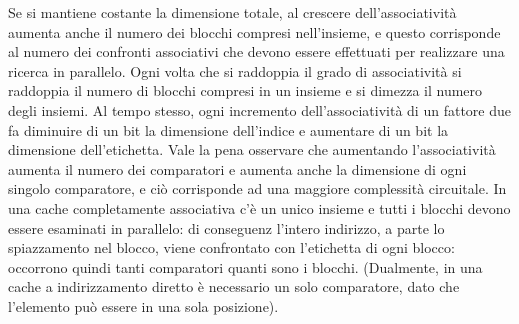 \begin{figure}[ht]
    \centering
    \setlength{\fboxrule}{0.5pt} %
    \setlength{\fboxsep}{0pt}    %
\end{figure}

Se si mantiene costante la dimensione totale, al crescere dell'associatività aumenta anche il
numero dei blocchi compresi nell'insieme, e questo corrisponde al numero dei confronti  associativi che devono essere effettuati per realizzare una ricerca in parallelo. Ogni volta che si raddoppia il grado di associatività si raddoppia il numero di blocchi compresi in un insieme e si  dimezza il numero degli insiemi. Al tempo stesso, ogni incremento dell'associatività di un fattore due fa diminuire di un bit la dimensione dell'indice e aumentare di un bit la dimensione dell'etichetta. Vale la pena osservare che aumentando l'associatività aumenta il numero dei comparatori e aumenta anche la dimensione di ogni singolo comparatore, e ciò corrisponde ad una maggiore complessità circuitale. In una cache completamente associativa c'è un unico insieme e tutti i blocchi devono essere esaminati in parallelo: di conseguenz l'intero indirizzo, a parte lo spiazzamento nel blocco, viene confrontato con l'etichetta di ogni blocco: occorrono quindi tanti comparatori quanti sono i blocchi. (Dualmente, in una cache a indirizzamento diretto è necessario un solo comparatore, dato che l'elemento può essere in una sola posizione).

